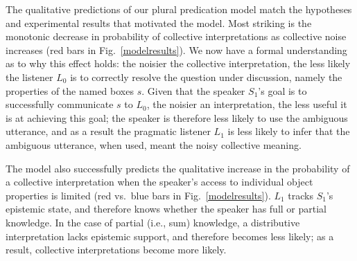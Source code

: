 \documentclass[preprint,12pt,authoryear,titlepage]{elsarticle}
\begin{document}


The qualitative predictions of our plural predication model match the hypotheses and experimental results that motivated the model. Most striking is the monotonic decrease in probability of collective interpretations as collective noise increases (red bars in  Fig.~\ref{modelresults}). We now have a formal understanding as to why this effect holds: the noisier the collective interpretation, the less likely the listener $L_{0}$ is to correctly resolve the question under discussion, namely the properties of the named boxes $s$. Given that the speaker $S_{1}$'s goal is to successfully communicate $s$ to $L_{0}$, the noisier an interpretation, the less useful it is at achieving this goal; the speaker is therefore less likely to use the ambiguous utterance, and as a result the pragmatic listener $L_{1}$ is less likely to infer that the ambiguous utterance, when used, meant the noisy collective meaning.

The model also successfully predicts the qualitative increase in the probability of a collective interpretation when the speaker's  access to individual object properties is limited (red vs.~blue bars in  Fig.~\ref{modelresults}). %
$L_{1}$ tracks  $S_{1}$'s epistemic state, and therefore knows whether the speaker has full or partial knowledge. In the case of partial (i.e., sum)  knowledge, a distributive interpretation lacks epistemic support, and therefore becomes less likely; as a result, collective interpretations become more likely.

\end{document}
